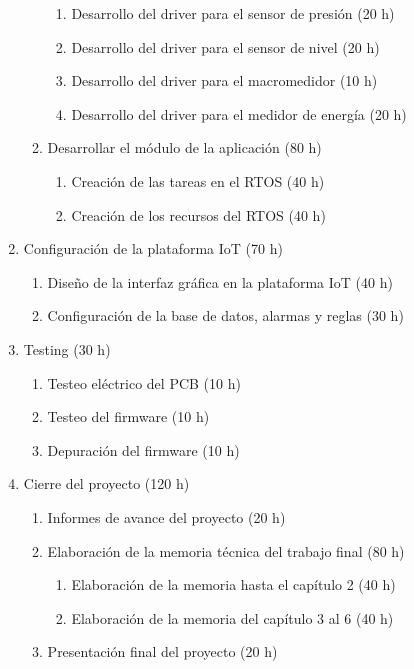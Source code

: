 \documentclass[
11pt, %
codirector, %
]{charter}
\begin{document}
\begin{enumerate}
\begin{enumerate}
	\begin{enumerate}
		\item Desarrollo del driver para el sensor de presión (20 h)
		\item Desarrollo del driver para el sensor de nivel (20 h)
		\item Desarrollo del driver para el macromedidor (10 h)
		\item Desarrollo del driver para el medidor de energía (20 h)
	\end{enumerate}
	\item Desarrollar el módulo de la aplicación (80 h)
	\begin{enumerate}
		\item Creación de las tareas en el RTOS (40 h)
		\item Creación de los recursos del RTOS (40 h)
	\end{enumerate}
	\end{enumerate}
\item Configuración de la plataforma IoT (70 h)
    \begin{enumerate}
		\item Diseño de la interfaz gráfica en la plataforma IoT (40 h)
		\item Configuración de la base de datos, alarmas y reglas (30 h)
	\end{enumerate}
\item Testing (30 h)	
    \begin{enumerate}
		\item Testeo eléctrico del PCB (10 h)
		\item Testeo del firmware (10 h)
		\item Depuración del firmware (10 h)
	\end{enumerate}
\item Cierre del proyecto (120 h)	
    \begin{enumerate}
		\item Informes de avance del proyecto (20 h)
		\item Elaboración de la memoria técnica del trabajo final (80 h)
		\begin{enumerate}
			\item Elaboración de la memoria hasta el capítulo 2 (40 h)
			\item Elaboración de la memoria del capítulo 3 al 6 (40 h)
		\end{enumerate}
		\item Presentación final del proyecto (20 h)
	\end{enumerate}


\end{enumerate}
\end{document}
